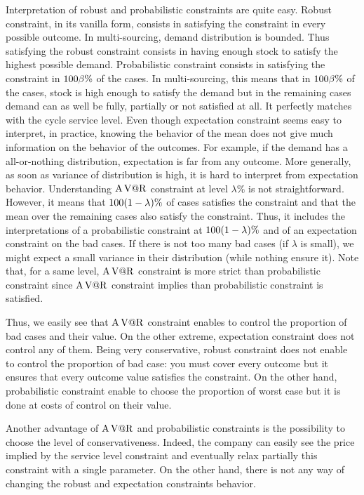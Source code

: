 Interpretation of robust and probabilistic constraints are quite easy.
Robust constraint, in its vanilla form, consists in satisfying the constraint in every possible outcome.
In multi-sourcing, demand distribution is bounded.
Thus satisfying the robust constraint consists in having enough stock to satisfy the highest possible demand.
Probabilistic constraint consists in satisfying the constraint in $100\beta\%$ of the cases.
In multi-sourcing, this means that in $100\beta\%$ of the cases, stock is high enough to satisfy the demand but in the remaining cases demand can as well be fully, partially or not satisfied at all.
It perfectly matches with the cycle service level.
Even though expectation constraint seems easy to interpret, in practice, knowing the behavior of the mean does not give much information on the behavior of the outcomes.
For example, if the demand has a all-or-nothing distribution, expectation is far from any outcome.
More generally, as soon as variance of distribution is high, it is hard to interpret from expectation behavior.
Understanding $\operatorname{A\operatorname{V@R}}$ constraint at level $\lambda\%$ is not straightforward.
However, it means that $100\bracket{1-\lambda}\%$ of cases satisfies the constraint and that the mean over the remaining cases also satisfy the constraint.
Thus, it includes the interpretations of a probabilistic constraint at $100\bracket{1-\lambda}\%$ and of an expectation constraint on the bad cases.
If there is not too many bad cases (\ie if $\lambda$ is small), we might expect a small variance in their distribution (while nothing ensure it).
Note that, for a same level, $\operatorname{A\operatorname{V@R}}$ constraint is more strict than probabilistic constraint since $\operatorname{A\operatorname{V@R}}$ constraint implies than probabilistic constraint is satisfied.



Thus, we easily see that $\operatorname{A\operatorname{V@R}}$ constraint enables to control the proportion of bad cases and their value.
On the other extreme, expectation constraint does not control any of them.
Being very conservative, robust constraint does not enable to control the proportion of bad case: you must cover every outcome but it ensures that every outcome value satisfies the constraint.
On the other hand, probabilistic constraint enable to choose the proportion of worst case but it is done at costs of control on their value.


Another advantage of $\operatorname{A\operatorname{V@R}}$ and probabilistic constraints is the possibility to choose the level of conservativeness.
Indeed, the company can easily see the price implied by the service level constraint and eventually relax partially this constraint with a single parameter.
On the other hand, there is not any way of changing the robust and expectation constraints behavior.


